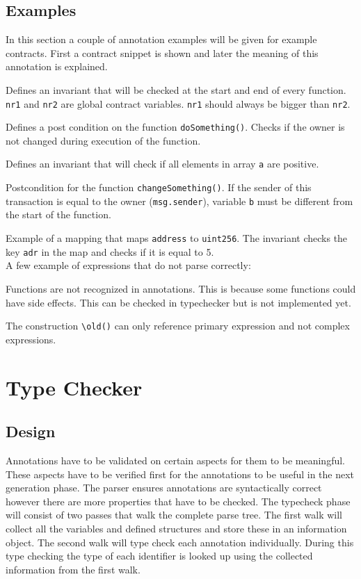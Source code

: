 \documentclass[a4paper]{article}
\begin{document}
\subsection{Examples}
In this section a couple of annotation examples will be given for example contracts. First a contract snippet is shown and later the meaning of this annotation is explained.

Defines an invariant that will be checked at the start and end of every function. \texttt{nr1} and \texttt{nr2} are global contract variables. \texttt{nr1} should always be bigger than \texttt{nr2}.

Defines a post condition on the function \texttt{doSomething()}. Checks if the owner is not changed during execution of the function.

Defines an invariant that will check if all elements in array \texttt{a} are positive.

Postcondition for the function \texttt{changeSomething()}. If the sender of this transaction is equal to the owner (\texttt{msg.sender}), variable \texttt{b} must be different from the start of the function. 

Example of a mapping that maps \texttt{address} to \texttt{uint256}. The invariant checks the key \texttt{adr} in the map and checks if it is equal to 5. \hfill\\
A few example of expressions that do not parse correctly:

Functions are not recognized in annotations. This is because some functions could have side effects. This can be checked in typechecker but is not implemented yet.

The construction \texttt{\textbackslash old()} can only reference primary expression and not complex expressions.

\section{Type Checker}
\label{sec:typechecker}
\subsection{Design}
Annotations have to be validated on certain aspects for them to be meaningful. These aspects have to be verified first for the annotations to be useful in the next generation phase. The parser ensures annotations are syntactically correct however there are more properties that have to be checked. The typecheck phase will consist of two passes that walk the complete parse tree. The first walk will collect all the variables and defined structures and store these in an information object. The second walk will type check each annotation individually. During this type checking the type of each identifier is looked up using the collected information from the first walk. 
\end{document}
